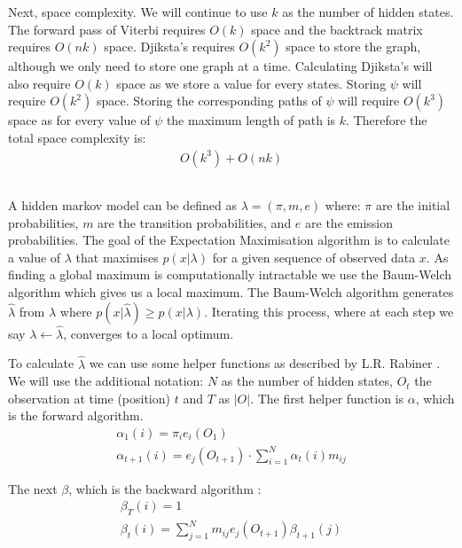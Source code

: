 Next, space complexity.
We will continue to use $k$ as the number of hidden states.
The forward pass of Viterbi requires $O(k)$ space and the backtrack matrix requires $O(nk)$ space.
Djiksta's requires $O(k^2)$ space to store the graph, although we only need to store one graph at a time.
Calculating Djiksta's will also require $O(k)$ space as we store a value for every states.
Storing $\psi$ will require $O(k^2)$ space.
Storing the corresponding paths of $\psi$ will require $O(k^3)$ space as for every value of $\psi$ the maximum length of path is $k$.
Therefore the total space complexity is:
\begin{align*}
    O(k^3) + O(nk)
\end{align*} 



\subsection{}
A hidden markov model can be defined as $\lambda = (\pi, m, e)$ where: $\pi$ are the initial probabilities, $m$ are the transition probabilities, and $e$ are the emission probabilities.
The goal of the Expectation Maximisation algorithm is to calculate a value of $\lambda$ that maximises $p(x|\lambda)$ for a given sequence of observed data $x$.
As finding a global maximum is computationally intractable we use the Baum-Welch algorithm which gives us a local maximum.
The Baum-Welch algorithm generates $\hat{\lambda}$ from $\lambda$ where $p(x|\hat{\lambda}) \geq p(x|\lambda)$.
Iterating this process, where at each step we say $\lambda \gets \hat{\lambda}$, converges to a local optimum.

To calculate $\hat{\lambda}$ we can use some helper functions as described by L.R. Rabiner \cite{em}.
We will use the additional notation: $N$ as the number of hidden states, $O_t$ the observation at time (position) $t$ and $T$ as $|O|$.
The first helper function is $\alpha$, which is the forward algorithm.
\begin{gather*}
    \alpha_1(i) = \pi_i e_i(O_1)\\
    \alpha_{t+1}(i) = e_j(O_{t+1}) \cdot \sum_{i=1}^N\alpha_t(i)m_{ij}
\end{gather*}

The next $\beta$, which is the backward algorithm :
\begin{gather*}
    \beta_T(i)=1\\
    \beta_t(i)=\sum_{j=1}^N m_{ij} e_j(O_{t+1}) \beta_{t+1}(j)
\end{gather*}

